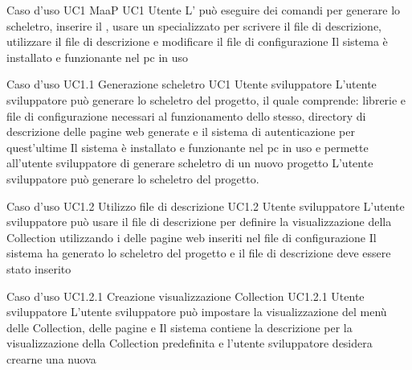\UCtitle
{Caso d'uso UC1}
{MaaP}
\UC
{UC1}
{Utente }
{L'  può eseguire dei comandi per generare lo scheletro, inserire il , usare un  specializzato per scrivere il file di descrizione, utilizzare il file di descrizione e modificare il file di configurazione}
{Il sistema è installato e funzionante nel pc in uso}

\UCtitle
{Caso d'uso UC1.1}
{Generazione scheletro}
\UC
{UC1}
{Utente sviluppatore}
{L'utente sviluppatore può generare lo scheletro del progetto, il quale comprende: librerie e file di configurazione necessari al funzionamento dello stesso, directory di descrizione delle pagine web generate e il sistema di autenticazione per quest'ultime}
{Il sistema è installato e funzionante nel pc in uso e permette all'utente sviluppatore di generare scheletro di un nuovo progetto}
\scenario
{L'utente sviluppatore può generare lo scheletro del progetto.}



\UCtitle
{Caso d'uso UC1.2}
{Utilizzo file di descrizione}
\UC
{UC1.2}
{Utente sviluppatore}
{L'utente sviluppatore  può usare il file di descrizione per definire la visualizzazione della Collection utilizzando i  delle pagine web inseriti nel file di configurazione}
{Il sistema ha generato lo scheletro del progetto e il file di descrizione deve essere stato inserito}

\UCtitle
{Caso d'uso UC1.2.1}
{Creazione visualizzazione Collection}
\UC
{UC1.2.1}
{Utente sviluppatore}
{L'utente sviluppatore  può impostare la visualizzazione del menù delle Collection, delle pagine  e }
{Il sistema contiene la descrizione per la visualizzazione della Collection predefinita e l'utente sviluppatore desidera crearne una nuova}

